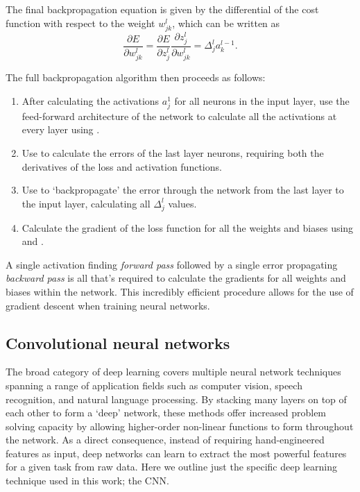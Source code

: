 The final backpropagation equation is given by the differential of the cost function with respect
to the weight $w^{l}_{jk}$, which can be written as
\begin{equation} %
    \frac{\partial E}{\partial w^{l}_{jk}}
    =\frac{\partial E}{\partial z^{l}_{j}}\frac{\partial z^{l}_{j}}{\partial w^{l}_{jk}}
    =\Delta^{l}_{j}a^{l-1}_{k}.
    \label{eq:backprop_4}
\end{equation}

The full backpropagation algorithm then proceeds as follows:
\begin{enumerate}
    \item After calculating the activations $a^{1}_{j}$ for all neurons in the input layer, use
          the feed-forward architecture of the network to calculate all the activations at every
          layer using .
    \item Use  to calculate the errors of the last layer neurons,
          requiring both the derivatives of the loss and activation functions.
    \item Use  to `backpropagate' the error through the network from
          the last layer to the input layer, calculating all $\Delta^{l}_{j}$ values.
    \item Calculate the gradient of the loss function for all the weights and biases using
           and .
\end{enumerate}

A single activation finding \emph{forward pass} followed by a single error propagating
\emph{backward pass} is all that's required to calculate the gradients for all weights and biases
within the network. This incredibly efficient procedure allows for the use of gradient descent
when training neural networks.

\subsection{Convolutional neural networks} %
\label{sec:cnn_theory_conv} %

The broad category of deep learning covers multiple neural network techniques spanning a range of
application fields such as computer vision, speech recognition, and natural language processing.
By stacking many layers on top of each other to form a `deep' network, these methods offer
increased problem solving capacity by allowing higher-order non-linear functions to form
throughout the network. As a direct consequence, instead of requiring hand-engineered features as
input, deep networks can learn to extract the most powerful features for a given task from raw
data. Here we outline just the specific deep learning technique used in this work; the CNN.

